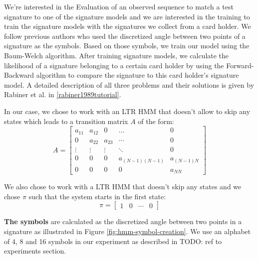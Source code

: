 \documentclass[a4paper, oneside]{csthesis}
\begin{document}
We're interested in the Evaluation of an observed sequence to match a test signature to one of the signature models and we are interested in the training to train the signature models with the signatures we collect from a card holder. We follow previous authors who used the discretized angle between two points of a signature as the symbols. Based on those symbols, we train our model using the Baum-Welch algorithm. After training signature models, we calculate the likelihood of a signature belonging to a certain card holder by using the Forward-Backward algorithm to compare the signature to this card holder's signature model. A detailed description of all three problems and their solutions is given by Rabiner et al. in \ref{rabiner1989tutorial}.

In our case, we chose to work with an LTR HMM that doesn't allow to skip any states which leads to a transition matrix $A$ of the form:
\begin{equation}
A = \left[\begin{array}{ccccc}a_{11} & a_{12} & 0 & \hdots & 0 \\0 & a_{22} & a_{23} & \cdots & 0 \\\vdots & \vdots & \vdots & \ddots & 0 \\0 & 0 & 0 & a_{(N-1)(N-1)} & a_{(N-1)N} \\0 & 0 & 0 & 0 & a_{NN}\end{array}\right]
\label{eq:hmm-transition-matrix}
\end{equation}


We also chose to work with a LTR HMM that doesn't skip any states and we chose $\pi$ such that the system starts in the first state:
$$\pi = \left[\begin{array}{cccc}1 & 0 & \cdots & 0\end{array}\right]$$


\textbf{The symbols} are calculated as the discretized angle between two points in a signature as illustrated in Figure \ref{fig:hmm-symbol-creation}. We use an alphabet of 4, 8 and 16 symbols in our experiment as described in TODO: ref to experiments section.
\end{document}
